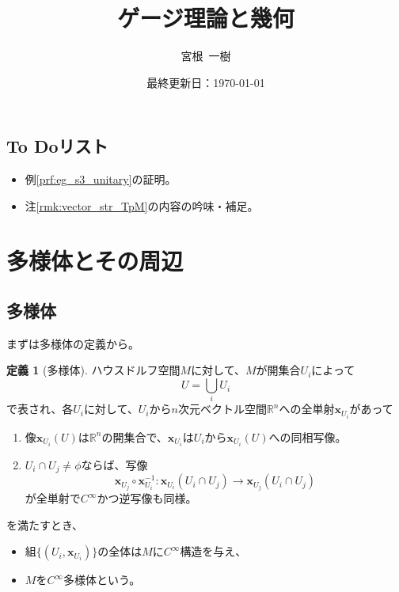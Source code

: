 \documentclass[unicode,a4paper,11pt]{ltjsarticle}
\title{
  ゲージ理論と幾何
}
\author{
  宮根\ 一樹
}
\date{最終更新日：\today}
\theoremstyle{definition}
\newtheorem{dfn}{定義}[section]
\begin{document}
\maketitle
\tableofcontents

\vspace*{5pt}

\subsection*{To Doリスト}

\begin{itemize}
  \item 
  例\ref{prf:eg_s3_unitary}の証明。
  \item 
  注\ref{rmk:vector_str_TpM}の内容の吟味・補足。
\end{itemize}

\clearpage
\section{多様体とその周辺}

\subsection{多様体}

まずは多様体の定義から。

\begin{dfn}[多様体]
  ハウスドルフ空間$M$に対して、$M$が開集合$U_{i}$によって
  \begin{equation}
    U
    =
    \bigcup_{i}U_{i}
  \end{equation}
  で表され、各$U_{i}$に対して、$U_{i}$から$n$次元ベクトル空間$\mathbb{R}^{n}$への全単射$\bm{x}_{U_{i}}$があって
  \begin{enumerate}
    \item
          像$\bm{x}_{U_{i}}(U)$は$\mathbb{R}^{n}$の開集合で、$\bm{x}_{U_{i}}$は$U_{i}$から$\bm{x}_{U_{i}}(U)$への同相写像。
    \item
          $U_{i}\cap U_{j}\neq\phi$ならば、写像
          \begin{equation}
            \bm{x}_{U_{j}}\circ\bm{x}_{U_{i}}^{-1}
            :
            \bm{x}_{U_{i}}(U_{i}\cap U_{j})\rightarrow\bm{x}_{U_{j}}(U_{i}\cap U_{j})
          \end{equation}
          が全単射で$C^{\infty}$かつ逆写像も同様。
  \end{enumerate}
  を満たすとき、
  \begin{itemize}
    \item
          組$\{(U_{i},\bm{x}_{U_{i}})\}$の全体は$M$に$C^{\infty}$構造を与え、
    \item
          $M$を$C^{\infty}$多様体という。
  \end{itemize}
\end{dfn}
\end{document}
